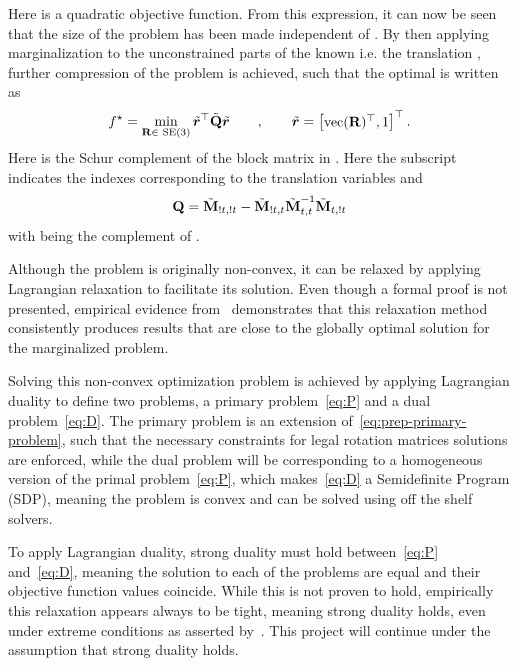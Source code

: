 Here  is a quadratic objective function. From this expression, it can now be seen that the size of the problem has been made independent of . By then applying marginalization to the unconstrained parts of the known  i.e. the translation , further compression of the problem is achieved, such that the optimal  is written as
%
\begin{equation}\label{eq:prep-primary-problem}
	f^\star = \min_{\mat{R}\in \SE (3)} \tilde{\vec{r}}^\T \tilde{\mat{Q}} \tilde{\vec{r}} \qquad, \qquad \tilde{\vec{r}}=\rvec{\text{vec}(\mat{R})^\T, 1}^\T.
\end{equation}
Here  is the Schur complement of the block matrix  in . Here the  subscript indicates the indexes corresponding to the translation variables and
\begin{equation}
	\bm{\mathrm{Q}} = \tilde{\bm{\mathrm{M}}}_{!t,!t} - \tilde{\bm{\mathrm{M}}}_{!t,t}\tilde{\bm{\mathrm{M}}}_{t,t}^{-1} \tilde{\bm{\mathrm{M}}}_{t,!t}
\end{equation}
with  being the complement of .\medskip 

Although the problem is originally non-convex, it can be relaxed by applying Lagrangian relaxation to facilitate its solution. Even though a formal proof is not presented, empirical evidence from~\cite{convex-global-3d-registration-with-lagrangian-duality} demonstrates that this relaxation method consistently produces results that are close to the globally optimal solution for the marginalized problem. \medskip

Solving this non-convex optimization problem is achieved by applying Lagrangian duality to define two problems, a primary problem~\ref{eq:P} and a dual problem~\ref{eq:D}. The primary problem is an extension of~\eqref{eq:prep-primary-problem}, such that the necessary constraints for legal rotation matrices solutions are enforced, while the dual problem will be corresponding to a homogeneous version of the primal problem~\ref{eq:P}, which makes~\ref{eq:D} a Semidefinite Program (SDP), meaning the problem is convex and can be solved using off the shelf solvers. \medskip


To apply Lagrangian duality, strong duality must hold between~\ref{eq:P} and~\ref{eq:D}, meaning the solution to each of the problems are equal and their objective function values coincide. While this is not proven to hold, empirically this relaxation appears always to be tight, meaning strong duality holds, even under extreme conditions as asserted by~\cite{convex-global-3d-registration-with-lagrangian-duality}. This project will continue under the assumption that strong duality holds. \medskip

